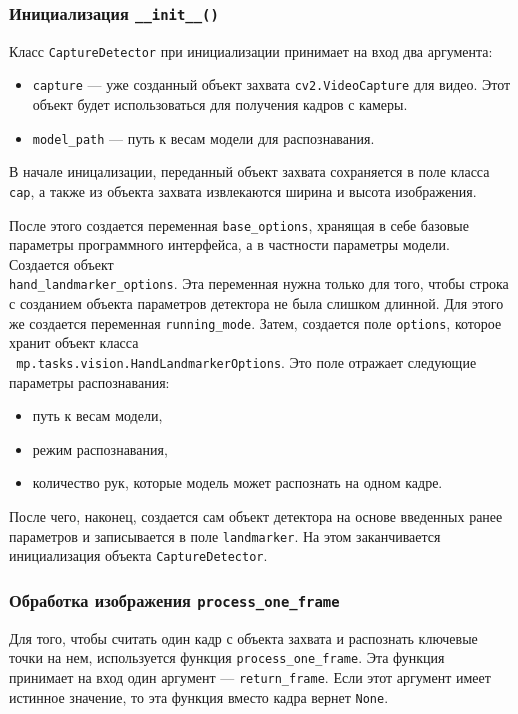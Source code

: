\documentclass[12pt, a4paper]{article}
\begin{document}
\subsubsection{Инициализация \texttt{\_\_init\_\_()}}
Класс \texttt{CaptureDetector} при инициализации принимает на вход два аргумента:
\begin{itemize}
  \item \texttt{capture} --- уже созданный объект захвата
    \texttt{cv2.VideoCapture} для видео. Этот объект будет использоваться для
    получения кадров с камеры.
  \item \texttt{model\_path} --- путь к весам модели для распознавания.
\end{itemize}

В начале иницализации, переданный объект захвата сохраняется в поле класса
\texttt{cap}, а также из объекта захвата извлекаются ширина и высота изображения.

После этого создается переменная \texttt{base\_options}, хранящая в себе
базовые параметры программного интерфейса, а в частности параметры модели.
Создается объект \\\texttt{hand\_landmarker\_options}. Эта переменная нужна
только для того, чтобы строка с созданием объекта параметров детектора не была слишком
длинной. Для этого же создается переменная \texttt{running\_mode}.
Затем, создается поле \texttt{options}, которое хранит объект класса 
\\\texttt{ mp.tasks.vision.HandLandmarkerOptions}. Это поле отражает следующие
параметры распознавания:
\begin{itemize}
  \item путь к весам модели,
  \item режим распознавания,
  \item количество рук, которые модель может распознать на одном кадре.
\end{itemize}
После чего, наконец, создается сам объект детектора на основе введенных ранее
параметров и записывается в поле \texttt{landmarker}.
На этом заканчивается инициализация объекта \texttt{CaptureDetector}.

\subsubsection{Обработка изображения \texttt{process\_one\_frame}}
Для того, чтобы считать один кадр с объекта захвата и распознать ключевые
точки на нем, используется функция
\texttt{process\_one\_frame}.
Эта функция принимает на вход один аргумент --- \texttt{return\_frame}. Если
этот аргумент имеет истинное значение, то эта функция вместо кадра вернет
\texttt{None}.
\end{document}
